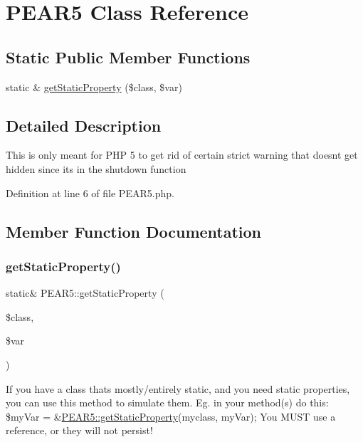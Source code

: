\hypertarget{classPEAR5}{}\section{P\+E\+A\+R5 Class Reference}
\label{classPEAR5}
\subsection*{Static Public Member Functions}
\begin{DoxyCompactItemize}
\item 
static \& \hyperlink{classPEAR5_a29ccb89d0bf8989788d0823c098325a6}{get\+Static\+Property} (\$class, \$var)
\end{DoxyCompactItemize}


\subsection{Detailed Description}
This is only meant for P\+HP 5 to get rid of certain strict warning that doesn\textquotesingle{}t get hidden since it\textquotesingle{}s in the shutdown function 

Definition at line 6 of file P\+E\+A\+R5.\+php.



\subsection{Member Function Documentation}
\mbox{\label{classPEAR5_a29ccb89d0bf8989788d0823c098325a6}} 
\subsubsection{\texorpdfstring{get\+Static\+Property()}{getStaticProperty()}}
{\footnotesize\ttfamily static\& P\+E\+A\+R5\+::get\+Static\+Property (\begin{DoxyParamCaption}\item[{}]{\$class,  }\item[{}]{\$var }\end{DoxyParamCaption})\hspace{0.3cm}{\ttfamily [static]}}

If you have a class that\textquotesingle{}s mostly/entirely static, and you need static properties, you can use this method to simulate them. Eg. in your method(s) do this\+: \$my\+Var = \&\hyperlink{classPEAR5_a29ccb89d0bf8989788d0823c098325a6}{P\+E\+A\+R5\+::get\+Static\+Property}(\textquotesingle{}myclass\textquotesingle{}, \textquotesingle{}my\+Var\textquotesingle{}); You M\+U\+ST use a reference, or they will not persist!

